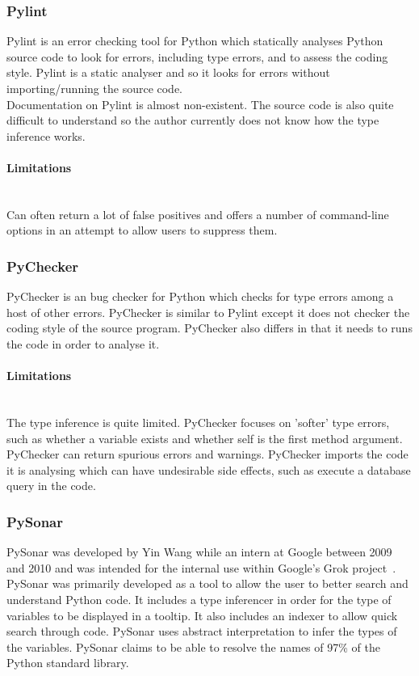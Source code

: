 \documentclass[12pt, titlepage]{article}
\begin{document}
\subsubsection{Pylint}
Pylint is an error checking tool for Python which statically analyses Python source code to look for errors, including type errors, and to assess the coding style. Pylint is a static analyser and so it looks for errors without importing/running the source code. \\
Documentation on Pylint is almost non-existent. The source code is also quite difficult to understand so the author currently does not know how the type inference works.
\paragraph{Limitations}\mbox{}\\
Can often return a lot of false positives and offers a number of command-line options in an attempt to allow users to suppress them.

\subsubsection{PyChecker}
PyChecker is an bug checker for Python which checks for type errors among a host of other errors. PyChecker is similar to Pylint except it does not checker the coding style of the source program. PyChecker also differs in that it needs to runs the code in order to analyse it.
\paragraph{Limitations}\mbox{}\\
The type inference is quite limited. PyChecker focuses on 'softer' type errors, such as whether a variable exists and whether self is the first method argument. \\
PyChecker can return spurious errors and warnings. PyChecker imports the code it is analysing which can have undesirable side effects, such as execute a database query in the code.

\subsubsection{PySonar}
PySonar was developed by Yin Wang while an intern at Google between 2009 and 2010 and was intended for the internal use within Google's Grok project~\cite{pySonar}. PySonar was primarily developed as a tool to allow the user to better search and understand Python code. It includes a type inferencer in order for the type of variables to be displayed in a tooltip. It also includes an indexer to allow quick search through code. PySonar uses abstract interpretation to infer the types of the variables. PySonar claims to be able to resolve the names of 97\% of the Python standard library.
\end{document}
